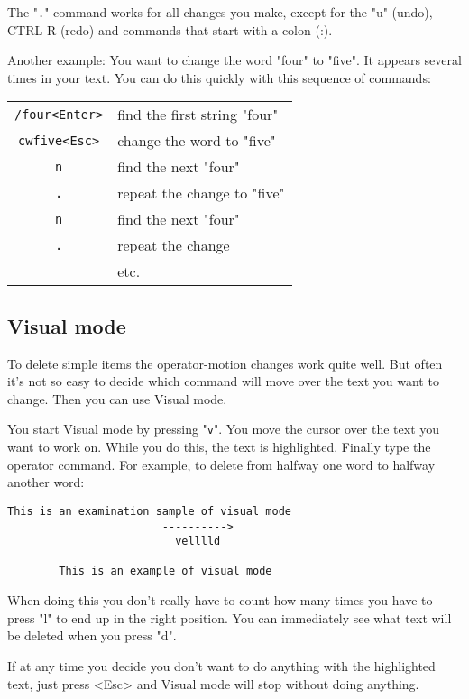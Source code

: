 The "\texttt{.}" command works for all changes you make, except for the "u" (undo),
CTRL-R (redo) and commands that start with a colon (:).

Another example: You want to change the word "four" to "five".
It appears several times in your text.
You can do this quickly with this sequence of commands:

\begin{center}
\begin{tabular}{c l}
				\texttt{/four<Enter>} & find the first string "four"\\
				\texttt{cwfive<Esc>} & change the word to "five"\\
				\texttt{n} & find the next "four"\\
				\texttt{.} & repeat the change to "five"\\
				\texttt{n} & find the next "four"\\
				\texttt{.} & repeat the change\\
						& etc.
\end{tabular}
\end{center}

\subsection{Visual mode}

To delete simple items the operator-motion changes work quite well.
But often it's not so easy to decide which command will move over the text you want to change.
Then you can use Visual mode.

You start Visual mode by pressing "\texttt{v}".
You move the cursor over the text you want to work on.
While you do this, the text is highlighted.
Finally type the operator command.
For example, to delete from halfway one word to halfway another word:

\begin{Verbatim}[samepage=true]
        This is an examination sample of visual mode 
                        ---------->
                          velllld

        This is an example of visual mode 
\end{Verbatim}

When doing this you don't really have to count how many times you have to press "l" to end up in the right position.
You can immediately see what text will be deleted when you press "d".

If at any time you decide you don't want to do anything with the highlighted text, just press <Esc> and Visual mode will stop without doing anything.
 
